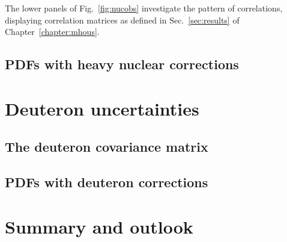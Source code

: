 The lower panels of Fig.~\ref{fig:nucobs} investigate the pattern of correlations, displaying correlation matrices as defined in Sec.~\ref{sec:results} of Chapter~\ref{chapter:mhous}.
\subsection{PDFs with heavy nuclear corrections}
\section{Deuteron uncertainties}
\label{sec:deutunc}
\subsection{The deuteron covariance matrix}
\subsection{PDFs with deuteron corrections}
\section{Summary and outlook}
\label{sec:summandoutlook}
